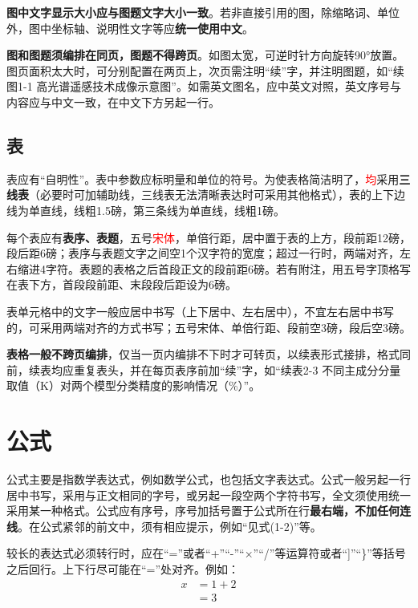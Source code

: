 \textbf{图中文字显示大小应与图题文字大小一致}。若非直接引用的图，除缩略词、单位外，图中坐标轴、说明性文字等应\textbf{统一使用中文}。

\textbf{图和图题须编排在同页，图题不得跨页}。如图太宽，可逆时针方向旋转90°放置。图页面积太大时，可分别配置在两页上，次页需注明“续”字，并注明图题，如“续图1-1 高光谱遥感技术成像示意图”。如需英文图名，应中英文对照，英文序号与内容应与中文一致，在中文下方另起一行。

\subsection{表}\label{sec2.4.2}

表应有“自明性”。表中参数应标明量和单位的符号。为使表格简洁明了，\textcolor{red}{均}采用\textbf{三线表}（必要时可加辅助线，三线表无法清晰表达时可采用其他格式），表的上下边线为单直线，线粗1.5磅，第三条线为单直线，线粗1磅。

每个表应有\textbf{表序、表题}，五号\textcolor{red}{宋体}，单倍行距，居中置于表的上方，段前距12磅，段后距6磅；表序与表题文字之间空1个汉字符的宽度；超过一行时，两端对齐，左右缩进4字符。表题的表格之后首段正文的段前距6磅。若有附注，用五号字顶格写在表下方，首段段前距、末段段后距设为6磅。

表单元格中的文字一般应居中书写（上下居中、左右居中），不宜左右居中书写的，可采用两端对齐的方式书写；五号宋体、单倍行距、段前空3磅，段后空3磅。

\textbf{表格一般不跨页编排}，仅当一页内编排不下时才可转页，以续表形式接排，格式同前，续表均应重复表头，并在每页表序前加“续”字，如“续表2-3 不同主成分分量取值（K）对两个模型分类精度的影响情况（\%）”。

\section{公式}\label{sec2.5}

公式主要是指数学表达式，例如数学公式，也包括文字表达式。公式一般另起一行居中书写，采用与正文相同的字号，或另起一段空两个字符书写，全文须使用统一采用某一种格式。公式应有序号，序号加括号置于公式所在行\textbf{最右端，不加任何连线}。在公式紧邻的前文中，须有相应提示，例如“见式(1-2)”等。

较长的表达式必须转行时，应在“=”或者“+”“-”“×”“/”等运算符或者“]”“\}”等括号之后回行。上下行尽可能在“=”处对齐。例如：
\begin{equation}
    \begin{aligned}
    x&=1+2\\
     &=3
    \end{aligned}
\end{equation}

